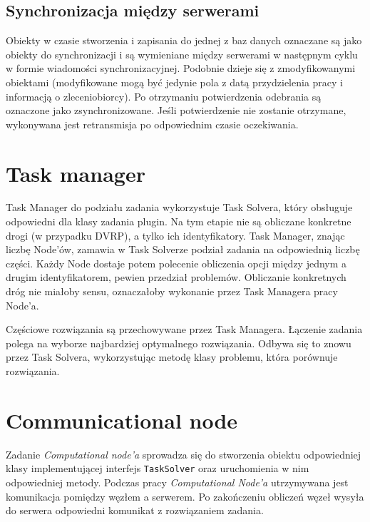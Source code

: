 \documentclass[12pt,a4paper,titlepage]{report}
\begin{document}
	\section{Synchronizacja między serwerami}
		Obiekty w czasie stworzenia i zapisania do jednej z baz danych oznaczane są jako obiekty
		do synchronizacji i są wymieniane między serwerami w następnym cyklu w formie wiadomości
		synchronizacyjnej. Podobnie dzieje się z zmodyfikowanymi obiektami (modyfikowane
		mogą być jedynie pola z datą przydzielenia pracy i informacją o zleceniobiorcy).
		Po otrzymaniu potwierdzenia odebrania są oznaczone jako zsynchronizowane. Jeśli
		potwierdzenie nie zostanie otrzymane, wykonywana jest retransmisja po odpowiednim
		czasie oczekiwania.
	
	\chapter{Task manager}
		Task Manager do podziału zadania wykorzystuje Task Solvera, który obsługuje odpowiedni dla klasy zadania plugin. Na tym etapie nie są obliczane konkretne drogi (w przypadku DVRP), a tylko ich identyfikatory. Task Manager, znając liczbę Node'ów, zamawia w Task Solverze podział zadania na odpowiednią liczbę części. Każdy Node dostaje potem polecenie obliczenia opcji między jednym a drugim identyfikatorem, pewien przedział problemów. Obliczanie konkretnych dróg nie miałoby sensu, oznaczałoby wykonanie przez Task Managera pracy Node'a.
		
		Częściowe rozwiązania są przechowywane przez Task Managera. Łączenie zadania polega na wyborze najbardziej optymalnego rozwiązania. Odbywa się to znowu przez Task Solvera, wykorzystując metodę klasy problemu, która porównuje rozwiązania.
	
	\chapter{Communicational node}
		Zadanie \textit{Computational node'a} sprowadza się do stworzenia obiektu odpowiedniej klasy implementującej interfejs \verb+TaskSolver+ oraz uruchomienia w nim odpowiedniej metody. Podczas pracy \textit{Computational Node'a } utrzymywana jest komunikacja pomiędzy węzłem a serwerem. Po zakończeniu obliczeń węzeł wysyła do serwera odpowiedni komunikat z rozwiązaniem zadania.
		
\end{document}
